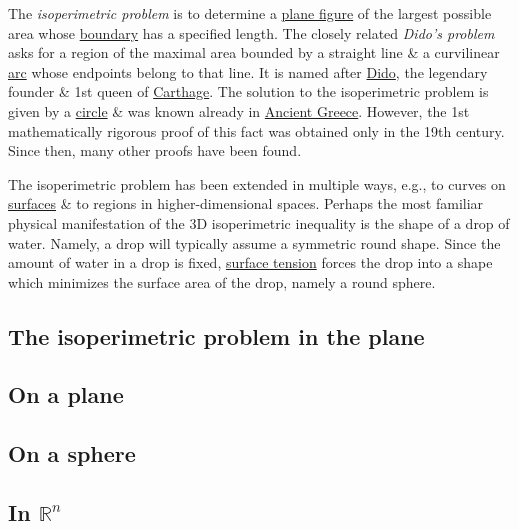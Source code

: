 \documentclass[oneside]{book}
\numberwithin{equation}{section}
\begin{document}
The \textit{isoperimetric problem} is to determine a \href{https://en.wikipedia.org/wiki/Plane_figure}{plane figure} of the largest possible area whose \href{https://en.wikipedia.org/wiki/Boundary_(topology)}{boundary} has a specified length. The closely related \textit{Dido's problem} asks for a region of the maximal area bounded by a straight line \& a curvilinear \href{https://en.wikipedia.org/wiki/Arc_(geometry)}{arc} whose endpoints belong to that line. It is named after \href{https://en.wikipedia.org/wiki/Dido_(Queen_of_Carthage)}{Dido}, the legendary founder \& 1st queen of \href{https://en.wikipedia.org/wiki/Carthage}{Carthage}. The solution to the isoperimetric problem is given by a \href{https://en.wikipedia.org/wiki/Circle}{circle} \& was known already in \href{https://en.wikipedia.org/wiki/Ancient_Greece}{Ancient Greece}. However, the 1st mathematically rigorous proof of this fact was obtained only in the 19th century. Since then, many other proofs have been found.

The isoperimetric problem has been extended in multiple ways, e.g., to curves on \href{https://en.wikipedia.org/wiki/Differential_geometry_of_surfaces}{surfaces} \& to regions in higher-dimensional spaces. Perhaps the most familiar physical manifestation of the 3D isoperimetric inequality is the shape of a drop of water. Namely, a drop will typically assume a symmetric round shape. Since the amount of water in a drop is fixed, \href{https://en.wikipedia.org/wiki/Surface_tension}{surface tension} forces the drop into a shape which minimizes the surface area of the drop, namely a round sphere.

\subsection{The isoperimetric problem in the plane}

\subsection{On a plane}

\subsection{On a sphere}

\subsection{In $\mathbb{R}^n$}
\end{document}
